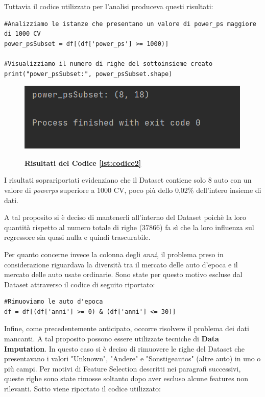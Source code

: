 Tuttavia il codice utilizzato per l'analisi produceva questi risultati:
\bigskip
{}
\pagebreak
\begin{lstlisting}
#Analizziamo le istanze che presentano un valore di power_ps maggiore di 1000 CV
power_psSubset = df[(df['power_ps'] >= 1000)]

#Visualizziamo il numero di righe del sottoinsieme creato
print("power_psSubset:", power_psSubset.shape)
\end{lstlisting}

\begin{figure}[H]
    \centering
    \caption{\textbf{Risultati del Codice \ref{lst:codice2}}}
    \includegraphics{Immagini/RisCodice2.png}
    \label{fig:my_label}
\end{figure}

I risultati soprariportati evidenziano che il Dataset contiene solo 8 auto con un valore di \textit{power\textunderscore ps} superiore a 1000 CV, poco più dello 0,02\% dell'intero insieme di dati. 

A tal proposito si è deciso di mantenerli all'interno del Dataset poichè la loro quantità rispetto al numero totale di righe (37866) fa sì che la loro influenza sul regressore sia quasi nulla e quindi trascurabile.

Per quanto concerne invece la colonna degli \textit{anni}, il problema preso in considerazione riguardava la diversità tra il mercato delle auto d'epoca e il mercato delle auto usate ordinarie. Sono state per questo motivo escluse dal Dataset attraverso il codice di seguito riportato:

\begin{lstlisting}
#Rimuoviamo le auto d'epoca
df = df[(df['anni'] >= 0) & (df['anni'] <= 30)]
\end{lstlisting}
\bigskip

Infine, come precedentemente anticipato, occorre risolvere il problema dei dati mancanti. A tal proposito possono essere utilizzate tecniche di \textbf{Data Imputation}. In questo caso si è deciso di rimuovere le righe del Dataset che presentavano i valori "Unknown", "Andere" e "Sonstige\textunderscore autos" (altre auto) in uno o più campi. Per motivi di Feature Selection descritti nei paragrafi successivi, queste righe sono state rimosse soltanto dopo aver escluso alcune features non rilevanti. Sotto viene riportato il codice utilizzato:

